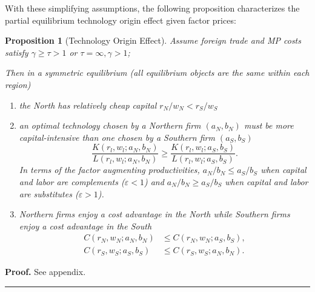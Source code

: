 \documentclass[notitlepage,11pt]{article}%
\newtheorem{proposition}{Proposition}
\newenvironment{proof}[1][Proof]{\noindent \textbf{#1.} }{\  \rule{0.5em}{0.5em}}
\begin{document}
With these simplifying assumptions, the following proposition characterizes
the partial equilibrium technology origin effect given factor prices:

\begin{proposition}
[Technology Origin Effect]\label{prop1} Assume foreign trade and MP costs
satisfy $\gamma\geq\tau>1$ or $\tau=\infty,\gamma>1$;

Then in a symmetric equilibrium (all equilibrium objects are the same within
each region)

\begin{enumerate}
\item the North has relatively cheap capital $r_{N}/w_{N}<r_{S}/w_{S}$

\item an optimal technology chosen by a Northern firm $\left(  a_{N}%
,b_{N}\right)  $ must be more capital-intensive than one chosen by a Southern
firm $\left(  a_{S},b_{S}\right)  $%
\[
\frac{K\left(  r_{l},w_{l};a_{N},b_{N}\right)  }{L\left(  r_{l},w_{l}%
;a_{N},b_{N}\right)  }\geq\frac{K\left(  r_{l},w_{l};a_{S},b_{S}\right)
}{L\left(  r_{l},w_{l};a_{S},b_{S}\right)  }.
\]
In terms of the factor augmenting productivities, $a_{N}/b_{N}\leq a_{S}%
/b_{S}$ when capital and labor are complements ($\varepsilon<1$) and
$a_{N}/b_{N}\geq a_{S}/b_{S}$ when capital and labor are substitutes
($\varepsilon>1$).

\item Northern firms enjoy a cost advantage in the North while Southern firms
enjoy a cost advantage in the South%
\begin{align*}
C\left(  r_{N},w_{N};a_{N},b_{N}\right)   &  \leq C\left(  r_{N},w_{N}%
;a_{S},b_{S}\right)  ,\\
C\left(  r_{S},w_{S};a_{S},b_{S}\right)   &  \leq C\left(  r_{S},w_{S}%
;a_{N},b_{N}\right)  .
\end{align*}

\end{enumerate}
\end{proposition}

\begin{proof}
See appendix.
\end{proof}
\end{document}
